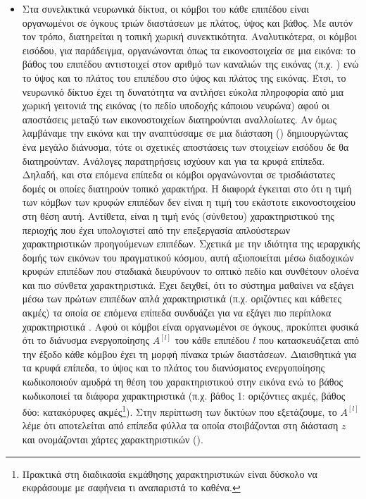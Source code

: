 \begin{itemize}
  \item Στα συνελικτικά νευρωνικά δίκτυα, οι κόμβοι του κάθε επιπέδου είναι οργανωμένοι σε όγκους τριών διαστάσεων με πλάτος, ύψος και βάθος. Με αυτόν τον τρόπο, διατηρείται η τοπική χωρική συνεκτικότητα. Αναλυτικότερα, οι κόμβοι εισόδου, για παράδειγμα, οργανώνονται όπως τα εικονοστοιχεία σε μια εικόνα: το βάθος του επιπέδου αντιστοιχεί στον αριθμό των καναλιών της εικόνας (π.χ. ) ενώ το ύψος και το πλάτος του επιπέδου στο ύψος και πλάτος της εικόνας. Έτσι, το νευρωνικό δίκτυο έχει τη δυνατότητα να αντλήσει εύκολα πληροφορία από μια χωρική γειτονιά της εικόνας (το πεδίο υποδοχής κάποιου νευρώνα) αφού οι αποστάσεις μεταξύ των εικονοστοιχείων διατηρούνται αναλλοίωτες. Αν όμως λαμβάναμε την εικόνα και την αναπτύσσαμε σε μια διάσταση () δημιουργώντας ένα μεγάλο διάνυσμα, τότε οι σχετικές αποστάσεις των στοιχείων εισόδου δε θα διατηρούνταν. Ανάλογες παρατηρήσεις ισχύουν και για τα κρυφά επίπεδα. Δηλαδή, και στα επόμενα επίπεδα οι κόμβοι οργανώνονται σε τρισδιάστατες δομές οι οποίες διατηρούν τοπικό χαρακτήρα. Η διαφορά έγκειται στο ότι η τιμή των κόμβων των κρυφών επιπέδων δεν είναι η τιμή του εκάστοτε εικονοστοιχείου στη θέση αυτή. Αντίθετα, είναι η τιμή ενός (σύνθετου) χαρακτηριστικού της περιοχής που έχει υπολογιστεί από την επεξεργασία απλούστερων χαρακτηριστικών προηγούμενων επιπέδων. Σχετικά με την ιδιότητα της ιεραρχικής δομής των εικόνων του πραγματικού κόσμου, αυτή αξιοποιείται μέσω διαδοχικών κρυφών επιπέδων που σταδιακά διευρύνουν το οπτικό πεδίο και συνθέτουν ολοένα και πιο σύνθετα χαρακτηριστικά. Έχει δειχθεί, ότι το σύστημα μαθαίνει να εξάγει μέσω των πρώτων επιπέδων απλά χαρακτηριστικά (π.χ. οριζόντιες και κάθετες ακμές) τα οποία σε επόμενα επίπεδα συνδυάζει για να εξάγει πιο περίπλοκα χαρακτηριστικά \cite{zeiler2014visualizing}. Αφού οι κόμβοι είναι οργανωμένοι σε όγκους, προκύπτει φυσικά ότι το διάνυσμα ενεργοποίησης $A^{[l]}$ του κάθε επιπέδου $l$ που κατασκευάζεται από την έξοδο κάθε κόμβου έχει τη μορφή πίνακα τριών διαστάσεων. Διαισθητικά για τα κρυφά επίπεδα, το ύψος και το πλάτος του διανύσματος ενεργοποίησης κωδικοποιούν αμυδρά τη θέση του χαρακτηριστικού στην εικόνα ενώ το βάθος κωδικοποιεί τα διάφορα χαρακτηριστικά (π.χ. βάθος 1: οριζόντιες ακμές, βάθος δύο: κατακόρυφες ακμές\footnote{Πρακτικά στη διαδικασία εκμάθησης χαρακτηριστικών είναι δύσκολο να εκφράσουμε με σαφήνεια τι αναπαριστά το καθένα.}). Στην περίπτωση των δικτύων που εξετάζουμε, το $A^{[l]}$ λέμε ότι αποτελείται από επίπεδα φύλλα τα οποία στοιβάζονται στη διάσταση $z$ και ονομάζονται χάρτες χαρακτηριστικών ().
  

\end{itemize}
